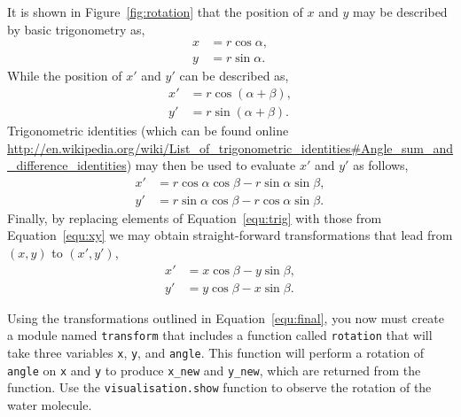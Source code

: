 \documentclass[a4paper]{article}
\begin{document}
It is shown in Figure~\ref{fig:rotation} that the position of $x$ and $y$ may be described by basic trigonometry as, 
%
\begin{equation}
  \begin{aligned}
    x & = r \cos{\alpha}, \\
    y & = r \sin{\alpha}.
  \end{aligned}
\label{equ:xy}
\end{equation}
%
While the position of $x'$ and $y'$ can be described as,
%
\begin{equation}
  \begin{aligned}
    x' & = r \cos{(\alpha + \beta)}, \\
    y' & = r \sin{(\alpha + \beta)}.
  \end{aligned}
\end{equation}
%
Trigonometric identities (which can be found online \url{http://en.wikipedia.org/wiki/List_of_trigonometric_identities#Angle_sum_and_difference_identities}) may then be used to evaluate $x'$ and $y'$ as follows, 
%
\begin{equation}
  \begin{aligned}
    x' & = r \cos{\alpha}\cos{\beta} - r\sin{\alpha}\sin{\beta}, \\
    y' & = r \sin{\alpha}\cos{\beta} - r\cos{\alpha}\sin{\beta}.
  \end{aligned}
\label{equ:trig}
\end{equation}
%
Finally, by replacing elements of Equation~\ref{equ:trig} with those from Equation~\ref{equ:xy} we may obtain straight-forward transformations that lead from $(x, y)$ to $(x', y')$, 
%
\begin{equation}
  \begin{aligned}
    x' & = x\cos{\beta} - y\sin{\beta}, \\
    y' & = y\cos{\beta} - x\sin{\beta}.
  \end{aligned}
\label{equ:final}
\end{equation}
%

Using the transformations outlined in Equation~\ref{equ:final}, you now must create a module named \texttt{transform} that includes a function called \texttt{rotation} that will take three variables \texttt{x}, \texttt{y}, and \texttt{angle}.
This function will perform a rotation of \texttt{angle} on \texttt{x} and \texttt{y} to produce \texttt{x\_new} and \texttt{y\_new}, which are returned from the function. 
Use the \texttt{visualisation.show} function to observe the rotation of the water molecule. 

%
%
\end{document}
